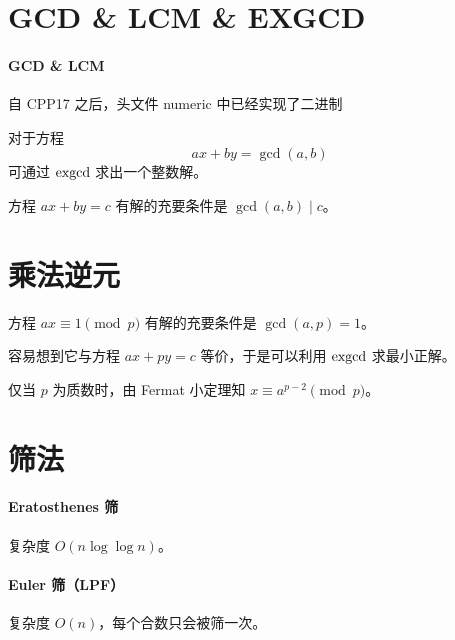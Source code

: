 \documentclass{probook}
\begin{document}
\begin{multicols}{2}
\section{GCD \& LCM \& EXGCD}

\paragraph{GCD \& LCM} 自 CPP17 之后，头文件 numeric 中已经实现了二进制



对于方程 
\[ax+by=\gcd(a,b)\]
可通过 $\rm exgcd$ 求出一个整数解。



方程 $ax+by=c$ 有解的充要条件是 $\gcd(a,b) \mid c$。

\section{乘法逆元}

方程 $ax \equiv 1 \pmod p$ 有解的充要条件是 $\gcd(a,p) = 1$。

容易想到它与方程 $ax + py = c$ 等价，于是可以利用 $\rm exgcd$ 求最小正解。



仅当 $p$ 为质数时，由 Fermat 小定理知 $x \equiv a^{p-2} \pmod p$。



\section{筛法}

\paragraph{Eratosthenes 筛}

复杂度 $O(n\log \log n)$。



\paragraph{Euler 筛（LPF）}

复杂度 $O(n)$，每个合数只会被筛一次。


\end{multicols}
\end{document}
